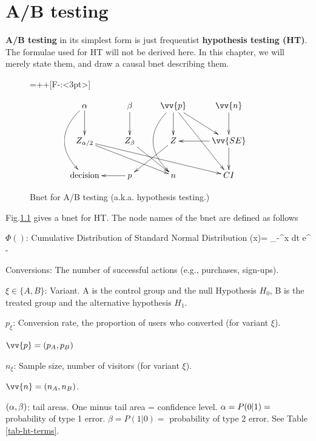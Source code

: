 \chapter{A/B testing}
\label{ch-a-b-testing}

{\bf A/B testing} in its simplest
form is just frequentist {\bf hypothesis testing (HT)}.
The formulae used for HT
will not be  derived here. 
In this chapter, we will merely state them,
and draw a causal bnet describing them.


\begin{figure}[h!]

{\entrymodifiers={++[F-:<3pt>]}

$$\xymatrix@R=25pt{
\alp\ar@/_2pc/[dd]\ar[d]
&
\beta\ar[d]
&
\vv{p}\ar@/_2pc/[dd]
\ar[dr]
\ar[d]
\ar[ddr]
&\vv{n}\ar[d]
\\
Z_{\alp/2}\ar[drr]
\ar[drrr]
&Z_\beta\ar[dr]
&Z\ar[dl]
&\vv{SE}\ar[l]\ar[d]
\\
\text{decision}
&p\ar[l]
&n
&CI
}$$
}
\caption{Bnet for A/B testing (a.k.a. 
hypothesis testing.)}
\label{fig-bnet-hypo-test}
\end{figure}

Fig.\ref{fig-bnet-hypo-test}
gives a bnet for HT. The node names 
of the bnet are defined as follows

$\Phi()$: Cumulative Distribution
of Standard Normal Distribution
\beq
\Phi (x)=
\int_{-\infty}^x dt\; e^{
-}
\eeq

Conversions: The number of successful actions (e.g., purchases, sign-ups). 

$\xi\in\{A,B\}$: Variant. A is the control group
and the null Hypothesis $H_0$, B is 
the treated group
and the alternative hypothesis $H_1$.
 
$p_\xi$: Conversion rate, the proportion of users who converted (for variant $\xi$).

$\vv{p}=(p_A, p_B)$

$n_\xi$: Sample size, number of visitors
(for variant $\xi$).
   
$\vv{n}=(n_A, n_B)$.

$(\alpha, \beta)$: tail areas. One minus tail area = confidence level. $\alpha=P(0|1)=$ probability of type 1 error. $\beta=P(1|0)=$
probability of type 2 error. See Table
\ref{tab-ht-terms}.


